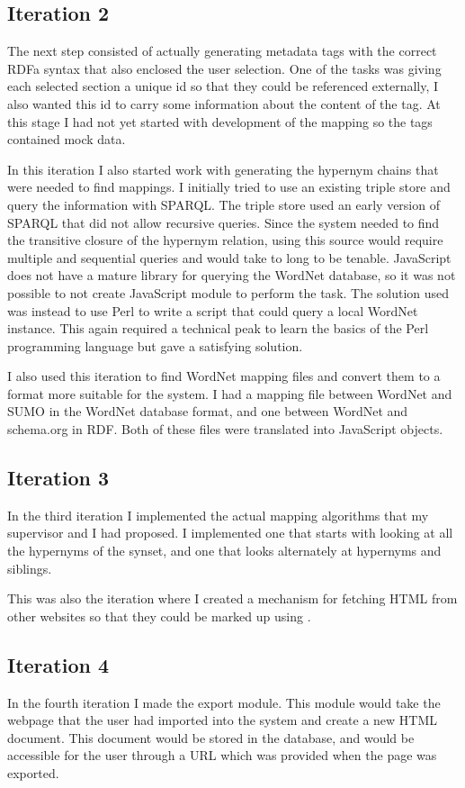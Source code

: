 \subsection{Iteration 2}
The next step consisted of actually generating metadata tags with the correct RDFa syntax that also enclosed the user selection.
One of the tasks was giving each selected section a unique id so that they could be referenced externally,
I also wanted this id to carry some information about the content of the tag.
At this stage I had not yet started with development of the mapping so the tags contained mock data.

In this iteration I also started work with generating the hypernym chains that were needed to find mappings.
I initially tried to use an existing triple store and query the information with SPARQL.
The triple store used an early version of SPARQL that did not allow recursive queries.
Since the system needed to find the transitive closure of the hypernym relation,
using this source would require multiple and sequential queries and would take to long to be tenable.
JavaScript does not have a mature library for querying the WordNet database,
so it was not possible to not create JavaScript module to perform the task.
The solution used was instead to use Perl to write a script that could query a local WordNet instance.
This again required a technical peak to learn the basics of the Perl programming language but gave a satisfying solution.

I also used this iteration to find WordNet mapping files and convert them to a format more suitable for the system.
I had a mapping file between WordNet and SUMO in the WordNet database format,
and one between WordNet and schema.org in RDF.
Both of these files were translated into JavaScript objects.

\subsection{Iteration 3}
In the third iteration I implemented the actual mapping algorithms that my supervisor and I had proposed.
I implemented one that starts with looking at all the hypernyms of the synset,
and one that looks alternately at hypernyms and siblings.

This was also the iteration where I created a mechanism for fetching HTML from other websites so that they could be
marked up using \theartefact.

\subsection{Iteration 4}
In the fourth iteration I made the export module.
This module would take the webpage that the user had imported into the system and create a new HTML document.
This document would be stored in the database, and would be accessible for the user through a URL which was provided when the page was exported.

